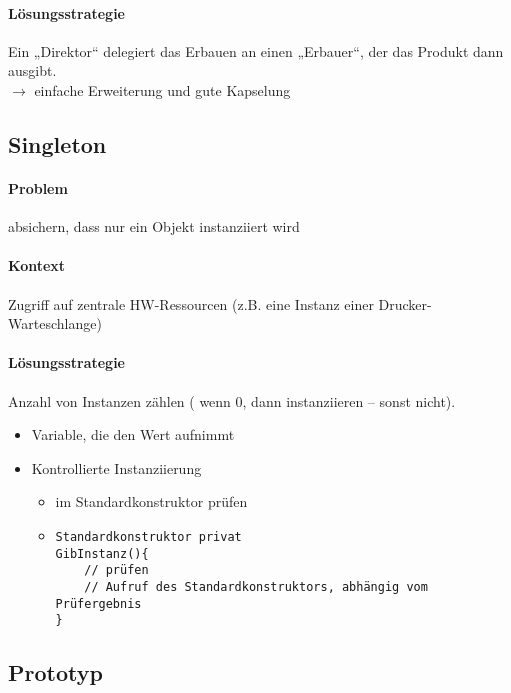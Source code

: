 \documentclass{scrreprt}
\begin{document}
\paragraph{Lösungsstrategie} Ein „Direktor“ delegiert das Erbauen an einen „Erbauer“, der das Produkt dann ausgibt.\\
$\to $ einfache Erweiterung und gute Kapselung

\subsection{Singleton}
\paragraph{Problem} absichern, dass nur ein Objekt instanziiert wird
\paragraph{Kontext} Zugriff auf zentrale HW-Ressourcen (z.B. eine Instanz einer Drucker-Warteschlange)
\paragraph{Lösungsstrategie} Anzahl von Instanzen zählen ( wenn 0, dann instanziieren -- sonst nicht).
\begin{itemize}
\item Variable, die den Wert aufnimmt
\item Kontrollierte Instanziierung
\begin{itemize}
\item im Standardkonstruktor prüfen
\item 
\begin{lstlisting}
Standardkonstruktor privat
GibInstanz(){
	// prüfen
	// Aufruf des Standardkonstruktors, abhängig vom Prüfergebnis
}
\end{lstlisting}
\end{itemize}
\end{itemize}

\subsection{Prototyp}
\end{document}

